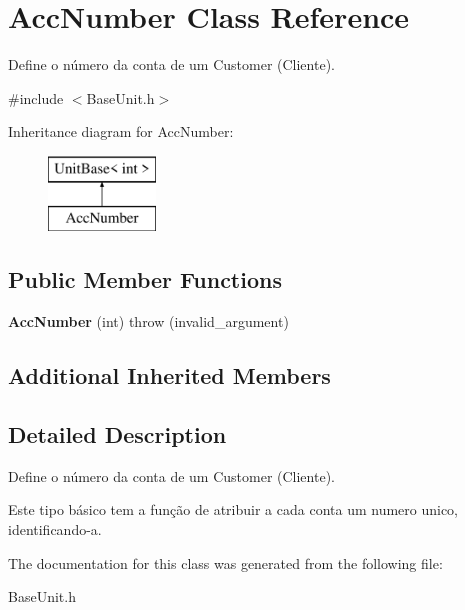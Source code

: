 \hypertarget{classAccNumber}{\section{Acc\-Number Class Reference}
\label{classAccNumber}
}


Define o número da conta de um Customer (Cliente).  




{\ttfamily \#include $<$Base\-Unit.\-h$>$}

Inheritance diagram for Acc\-Number\-:\begin{figure}[H]
\begin{center}
\leavevmode
\includegraphics[height=2.000000cm]{classAccNumber}
\end{center}
\end{figure}
\subsection*{Public Member Functions}
\begin{DoxyCompactItemize}
\item 
\hypertarget{classAccNumber_a11a8a2ea0849a83365960758a5ff3362}{{\bfseries Acc\-Number} (int)  throw (invalid\-\_\-argument)}\label{classAccNumber_a11a8a2ea0849a83365960758a5ff3362}

\end{DoxyCompactItemize}
\subsection*{Additional Inherited Members}


\subsection{Detailed Description}
Define o número da conta de um Customer (Cliente). 

Este tipo básico tem a função de atribuir a cada conta um numero unico, identificando-\/a. 

The documentation for this class was generated from the following file\-:\begin{DoxyCompactItemize}
\item 
Base\-Unit.\-h\end{DoxyCompactItemize}
